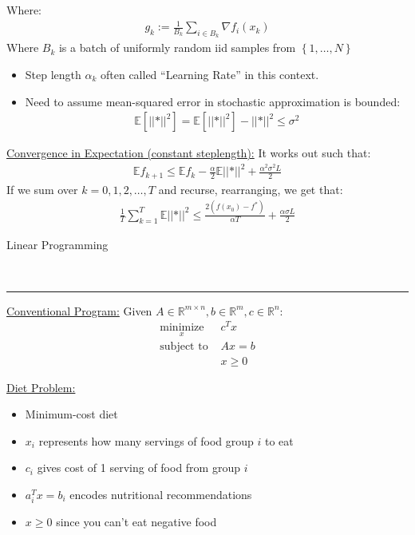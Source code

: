 \documentclass{article}
\newcommand{\header}[1]{\begin{large}\noindent #1\end{large}\\\rule{\textwidth}{0.5pt}}
\newcommand{\norm}[2]{\left\lvert\left\lvert#1\right\rvert\right\rvert}
\newcommand{\sheader}[1]{\underline{#1:}}
\newcommand{\curly}[1]{\left\{#1\right\}}
\newcommand{\oper}[2]{\underset{#2}{\operatorname{#1}}}
\begin{document}
Where:
\begin{align*}
    g_k := \frac{1}{B_k}\sum_{i \in B_k} \nabla f_i(x_k)
\end{align*}
Where $B_k$ is a batch of uniformly random iid samples from $\curly{1, \ldots, N}$
\begin{itemize}
    \item Step length $\alpha_k$ often called ``Learning Rate'' in this context.
    \item Need to assume mean-squared error in stochastic approximation is bounded:
    \begin{align*}
        \mathbb{E}\left[\norm*{g_k - \nabla f(x_k)}^2\right] =
        \mathbb{E}\left[\norm*{g_k}^2\right] - \norm*{\nabla f(x)}^2 \leq \sigma^2
    \end{align*}
\end{itemize}

\sheader{Convergence in Expectation (constant steplength)} It works 
out such that:
\begin{align*}
    \mathbb{E}f_{k+1} \leq \mathbb{E} f_k - \frac{\alpha}{2} \mathbb{E} \norm*{\nabla f_k}^2 + \frac{\alpha^2 \sigma^2 L}{2}
\end{align*}
If we sum over $k = 0, 1, 2, \ldots, T$ and recurse, rearranging, we get that:
\begin{align*}
    \frac{1}{T}\sum_{k=1}^{T}\mathbb{E}\norm*{\nabla f(x_k)}^2 \leq \frac{2(f(x_0) - f^*)}{\alpha T} + \frac{\alpha \sigma L}{2}
\end{align*}

\header{Linear Programming}
\sheader{Conventional Program} Given $A \in \mathbb{R}^{m\times n}, b\in \mathbb{R}^m, c \in \mathbb{R}^n$:
\begin{align*}
    \oper{minimize}{x}\,\,\, &c^Tx\\
    \textrm{subject to } &Ax=b\\
    &x \geq 0
\end{align*}

\sheader{Diet Problem} 
\begin{itemize}
    \item Minimum-cost diet
    \item $x_i$ represents how many servings of food group $i$ to eat
    \item $c_i$ gives cost of 1 serving of food from group $i$
    \item $a_i^Tx = b_i$ encodes nutritional recommendations
    \item $x\geq 0$ since you can't eat negative food
\end{itemize}
\end{document}
